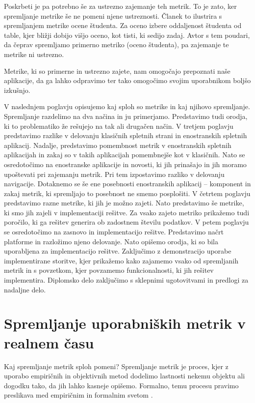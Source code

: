 \documentclass[a4paper, 12pt]{book}
\begin{document}
Poskrbeti je pa potrebno še za ustrezno zajemanje teh metrik. To je zato, ker spremljanje metrike še ne pomeni njene ustreznosti. Članek \cite{se_metrics} to ilustrira s spremljanjem metrike ocene študenta. Za oceno izbere oddaljenost študenta od table, kjer bližji dobijo višjo oceno, kot tisti, ki sedijo zadaj. Avtor s tem poudari, da čeprav spremljamo primerno metriko (oceno študenta), pa zajemanje te metrike ni ustrezno.

Metrike, ki so primerne in ustrezno zajete, nam omogočajo prepoznati  naše aplikacije, da ga lahko odpravimo ter tako omogočimo svojim uporabnikom boljšo izkušnjo.

V naslednjem poglavju opisujemo kaj sploh so metrike in kaj njihovo spremljanje. Spremljanje razdelimo na dva načina in ju primerjamo. Predstavimo tudi orodja, ki to problematiko že rešujejo na tak ali drugačen način. V tretjem poglavju predstavimo razlike v delovanju klasičnih spletnih strani in enostranskih spletnih aplikacij. Nadalje, predstavimo pomembnost metrik v enostranskih spletnih aplikacijah in zakaj so v takih aplikacijah pomembnejše kot v klasičnih. Nato se osredotočimo na enostranske aplikacije in novosti, ki jih prinašajo in jih moramo upoštevati pri zajemanju metrik. Pri tem izpostavimo razliko v delovanju navigacije. Dotaknemo se še ene posebnosti enostranskih aplikacij -- komponent in zakaj metrik, ki spremljajo to posebnost ne smemo posplošiti. V četrtem poglavju predstavimo razne metrike, ki jih je možno zajeti. Nato predstavimo še metrike, ki smo jih zajeli v implementaciji rešitve. Za vsako zajeto metriko prikažemo tudi poročilo, ki ga rešitev generira ob zadostnem številu podatkov. V petem poglavju se osredotočimo na zasnovo in implementacijo rešitve. Predstavimo načrt platforme in razložimo njeno delovanje. Nato opišemo orodja, ki so bila uporabljena za implementacijo rešitve. Zaključimo z demonstracijo uporabe implementirane storitve, kjer prikažemo kako zajamemo vsako od spremljanih metrik in s povzetkom, kjer povzamemo funkcionalnosti, ki jih rešitev implementira. Diplomsko delo zaključimo s sklepnimi ugotovitvami in predlogi za nadaljne delo.

\chapter{Spremljanje uporabniških metrik v realnem času}
\label{ch0}
Kaj spremljanje metrik sploh pomeni? Spremljanje metrik je proces, kjer z uporabo empiričnih in objektivnih metod dodelimo lastnosti nekemu objektu ali dogodku tako, da jih lahko kasneje opišemo. Formalno, temu procesu pravimo preslikava med empiričnim in formalnim svetom \cite{se_metrics}.
\end{document}
